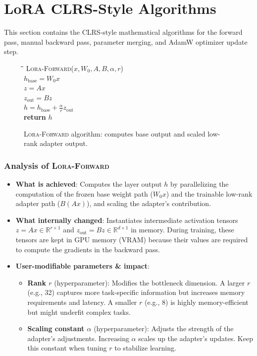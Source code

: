\documentclass{article}
\begin{document}
\section{LoRA CLRS-Style Algorithms}

This section contains the CLRS-style mathematical algorithms for the forward pass, manual backward pass, parameter merging, and AdamW optimizer update step.


\begin{figure}[h]
\centering
\begin{minipage}{0.8\linewidth}
\begin{tabbing}
\quad \= \quad \= \quad \= \kill
\textsc{Lora-Forward}($x, W_0, A, B, \alpha, r$) \\
\> $h_{\text{base}} = W_0 x$ \\
\> $z = A x$ \\
\> $z_{\text{out}} = B z$ \\
\> $h = h_{\text{base}} + \frac{\alpha}{r} z_{\text{out}}$ \\
\> \textbf{return} $h$
\end{tabbing}
\end{minipage}
\caption{\textsc{Lora-Forward} algorithm: computes base output and scaled low-rank adapter output.}
\end{figure}

\subsubsection{Analysis of \textsc{Lora-Forward}}
\begin{itemize}
  \item \textbf{What is achieved}: Computes the layer output $h$ by parallelizing the computation of the frozen base weight path ($W_0 x$) and the trainable low-rank adapter path ($B(A x)$), and scaling the adapter's contribution.
  \item \textbf{What internally changed}: Instantiates intermediate activation tensors $z = Ax \in \mathbb{R}^{r \times 1}$ and $z_{\text{out}} = Bz \in \mathbb{R}^{d \times 1}$ in memory. During training, these tensors are kept in GPU memory (VRAM) because their values are required to compute the gradients in the backward pass.
  \item \textbf{User-modifiable parameters \& impact}:
    \begin{itemize}
      \item \textbf{Rank $r$} (hyperparameter): Modifies the bottleneck dimension. A larger $r$ (e.g., 32) captures more task-specific information but increases memory requirements and latency. A smaller $r$ (e.g., 8) is highly memory-efficient but might underfit complex tasks.
      \item \textbf{Scaling constant $\alpha$} (hyperparameter): Adjusts the strength of the adapter's adjustments. Increasing $\alpha$ scales up the adapter's updates. Keep this constant when tuning $r$ to stabilize learning.
    \end{itemize}
\end{itemize}
\end{document}
